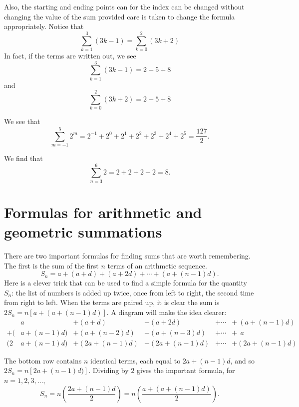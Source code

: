 Also, the starting and ending points can for the index can be changed
without changing the value of the sum provided
care is taken to change the formula appropriately. Notice that
\[
\sum_{k=1}^3 (3k-1)= \sum_{k=0}^2 (3k+2)
\]
In fact, if the terms are written out, we see
\[
\sum_{k=1}^3 (3k-1)= 2+5+8
\]
and 
\[
\sum_{k=0}^2 (3k+2) = 2+5+8
\]

\begin{exmp} We see that
\[
\sum_{m=-1}^5 2^m = 2^{-1} + 2^0 + 2^1 + 2^2 + 2^3 + 2^4 +2^5 = \frac{127}{2}.
\]
\end{exmp}

\begin{exmp} We find that
\[
 \sum_{n=3}^6 2 = 2+2+2+2 = 8.
\]
\end{exmp}

\section{Formulas for arithmetic and geometric summations}
  There are two important formulas for finding  sums 
that are worth remembering. The first is the sum of the first $n$ terms of
an arithmetic sequence.
\[
S_{n} = a +(a+d)+(a+2d) +\cdots +(a+(n-1)d).
\]
  Here is a clever trick that can be used to find a simple
formula for the quantity $S_n$: the list of numbers is added up twice,
once from left to right, the second time from right to left. When the
terms are paired up, it is clear the sum is $2S_{n}= n[a+(a+(n-1)d)]$.
A diagram will make the idea clearer:
\begin{align*}
     &a         &+ (a+d)~~~~~~~~~~~        &+ (a+2d)       &+ \cdots &+ ~(a+(n-1)d) \\
 +  (&a+(n-1)d) &+ (a+(n-2)d)   &+ (a+(n-3)d)   &+ \cdots &+ ~~a \\
 \hline
   (2&a+(n-1)d) &+ (2a+ (n-1)d) &+ (2a+ (n-1)d) &+\cdots  &+ (2a+ (n-1)d)
\end{align*}


The bottom row contains $n$ identical terms, each equal to $2a+(n-1)d$,
and so 
 $2S_{n}= n\left[2a+(n-1)d)\right]$. 
Dividing by $2$ gives the important formula, for $n=1,2,3,\ldots$, %
\begin{equation}\label{eqn:arith series formula}
S_{n}= n\left(\frac{2a+(n-1)d}{2}\right)=
  n\left(\frac{a +(a+(n-1)d)}{2}\right).
\end{equation}


